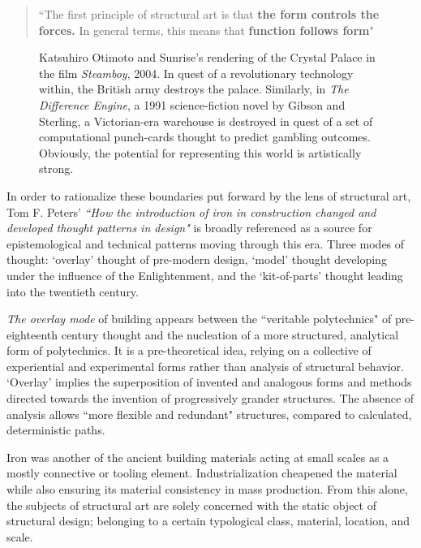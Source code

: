 \begin{quote}
  ``The first principle of structural art is that {\large{\textbf{the form controls the forces.}}} In general terms, this means that {\large{\textbf{function follows form}}}" \cite[p87]{TOWERANDBRIDGE}
\end{quote}

\begin{figure}[h!]
  \centering
  \caption{Katsuhiro Otimoto and Sunrise's rendering of the Crystal Palace in the film \textit{Steamboy}, 2004. In quest of a revolutionary technology within, the British army destroys the palace. Similarly, in \textit{The Difference Engine}, a 1991 science-fiction novel by Gibson and Sterling, a Victorian-era warehouse is destroyed in quest of a set of computational punch-cards thought to predict gambling outcomes. Obviously, the potential for representing this world is artistically strong.}
\end{figure}

In order to rationalize these boundaries put forward by the lens of structural art, Tom F. Peters' \textit{``How the introduction of iron in construction changed and developed thought patterns in design"} is broadly referenced as a source for epistemological and technical patterns moving through this era. Three modes of thought: `overlay' thought \cite[36]{IRON} of pre-modern design, `model' thought \cite[37]{IRON} developing under the influence of the Enlightenment, and the `kit-of-parts' thought \cite[53]{IRON} leading into the twentieth century.

\textit{The overlay mode} of building appears between the ``veritable polytechnics" of pre-eighteenth century thought and the nucleation of a more structured, analytical form of polytechnics. It is a pre-theoretical idea, relying on a collective of experiential and experimental forms rather than analysis of structural behavior. `Overlay' implies the superposition of invented and analogous forms and methods directed towards the invention of progressively grander structures. The absence of analysis allows ``more flexible and redundant" structures, compared to calculated, deterministic paths. \cite[p36, 37]{IRON}





Iron was another of the ancient building materials acting at small scales as a mostly connective or tooling element. Industrialization cheapened the material while also ensuring its material consistency in mass production. \cite{IRON} From this alone, the subjects of structural art are solely concerned with the static object of structural design; belonging to a certain typological class, material, location, and scale.

